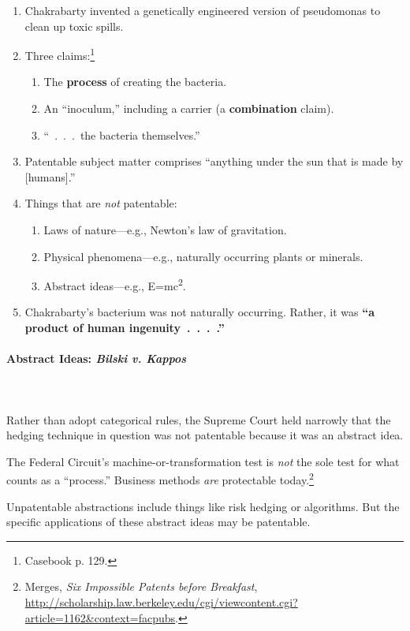 \begin{enumerate}
    \item Chakrabarty invented a genetically engineered version of pseudomonas 
    to clean up toxic spills.
    \item Three claims:\footnote{Casebook p. 129.}
    \begin{enumerate}
        \item The \textbf{process} of creating the bacteria.
        \item An ``inoculum,'' including a carrier (a \textbf{combination} 
        claim).
        \item ``~.~.~.~the bacteria themselves.''
    \end{enumerate}
    \item Patentable subject matter comprises ``anything under the sun that is 
    made by [humans].''
    \item Things that are \emph{not} patentable:
    \begin{enumerate}
        \item Laws of nature---e.g., Newton's law of gravitation.
        \item Physical phenomena---e.g., naturally occurring plants or minerals.
        \item Abstract ideas---e.g., E=mc\textsuperscript{2}.
    \end{enumerate}
    \item Chakrabarty's bacterium was not naturally occurring. Rather, it was 
    \textbf{``a product of human ingenuity~.~.~.~.''}
\end{enumerate}

\paragraph{Abstract Ideas: \emph{Bilski v. Kappos}} 
~\\\\
Rather than adopt categorical rules, the Supreme Court held narrowly that the 
hedging technique in question was not patentable because it was an abstract 
idea.

The Federal Circuit's machine-or-transformation test is \emph{not} the sole 
test for what counts as a ``process.'' Business methods \emph{are} protectable 
today.\footnote{Merges, \emph{Six Impossible Patents before Breakfast}, 
\url{http://scholarship.law.berkeley.edu/cgi/viewcontent.cgi?article=1162&context=facpubs}.}

Unpatentable abstractions include things like risk hedging or algorithms. But 
the specific applications of these abstract ideas may be patentable.

